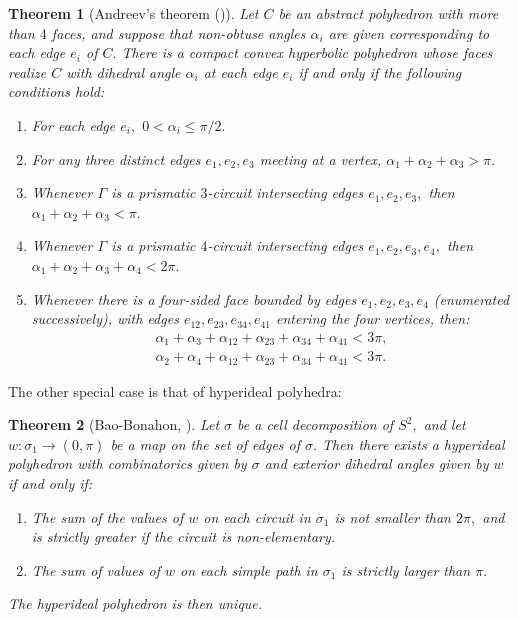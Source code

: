 \documentclass[12pt]{amsart}
\newtheorem{theorem}{Theorem}
\theoremstyle{remark}
\begin{document}
\begin{theorem}[Andreev's theorem (\cite{andreev1})]
Let $C$ be an abstract polyhedron with more than $4$ faces, and suppose that \emph{non-obtuse} angles $\alpha_i$ are given corresponding to each edge $e_i$ of $C.$ There is a compact convex hyperbolic polyhedron whose faces realize $C$ with dihedral angle $\alpha_i$ at each edge $e_i$ if and only if the following conditions hold:
\begin{enumerate}
\item For each edge $e_i,$ $0 < \alpha_i \leq \pi/2.$
\item For any three distinct edges $e_1, e_2, e_3$  meeting at a vertex, $\alpha_1 + \alpha_2 + \alpha_3 > \pi.$
\item Whenever $\Gamma$ is a prismatic $3$-circuit intersecting edges $e_1, e_2, e_3,$ then $\alpha_1 + \alpha_2 + \alpha_3 < \pi.$
\item Whenever $\Gamma$ is a prismatic $4$-circuit intersecting edges $e_1, e_2, e_3, e_4,$ then
$\alpha_1 + \alpha_2 + \alpha_3 + \alpha_4 <2\pi.$
\item Whenever there is a four-sided face bounded by edges $e_1, e_2, e_3, e_4$ (enumerated successively), with edges $e_{12}, e_{23}, e_{34}, e_{41}$ entering the four vertices, then:
\begin{gather}
\alpha_1 + \alpha_3 + \alpha_{12} + \alpha_{23} + \alpha_{34} + \alpha_{41} < 3\pi,\\
\alpha_2 + \alpha_4 + \alpha_{12} + \alpha_{23} + \alpha_{34} + \alpha_{41} < 3\pi.
\end{gather}
\end{enumerate}
\end{theorem}


The other special case is that of hyperideal polyhedra:
\begin{theorem}[Bao-Bonahon, \cite{bbpoly}]
Let $\sigma$ be a cell decomposition of $S^2,$ and let $w: \sigma_1 \rightarrow (0, \pi)$ be a map on the set of edges of $\sigma.$ Then there exists a hyperideal polyhedron with combinatorics given by $\sigma$ and exterior dihedral angles given by $w$ if and only if:
\begin{enumerate}
\item
The sum of the values of $w$ on each circuit in $\sigma_1$ is not smaller than $2\pi,$ and is strictly greater if the circuit is non-elementary. 
\item The sum of values of $w$ on each simple path in $\sigma_1$ is strictly larger than $\pi.$
\end{enumerate}
The hyperideal polyhedron is then unique.
\end{theorem}
\end{document}
